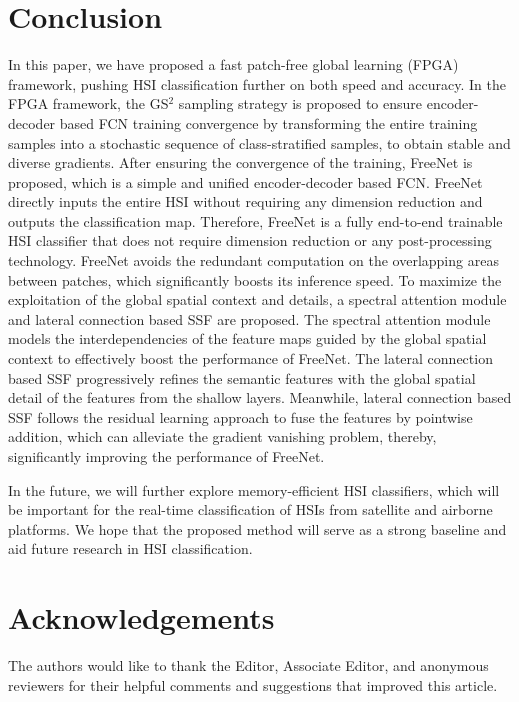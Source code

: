 \documentclass[journal]{IEEEtran}
\begin{document}
\section{Conclusion}
\label{sec:conclusion}
In this paper, we have proposed a fast patch-free global learning (FPGA) framework, pushing HSI classification further on both speed and accuracy.
In the FPGA framework, the GS$^2$ sampling strategy is proposed to ensure encoder-decoder based FCN training convergence by transforming the entire training samples into a stochastic sequence of class-stratified samples, to obtain stable and diverse gradients.
After ensuring the convergence of the training, FreeNet is proposed, which is a simple and unified encoder-decoder based FCN. 
FreeNet directly inputs the entire HSI without requiring any dimension reduction and outputs the classification map.
Therefore, FreeNet is a fully end-to-end trainable HSI classifier that does not require dimension reduction or any post-processing technology.
FreeNet avoids the redundant computation on the overlapping areas between patches, which significantly boosts its inference speed.
To maximize the exploitation of the global spatial context and details, a spectral attention module and lateral connection based SSF are proposed.
The spectral attention module models the interdependencies of the feature maps guided by the global spatial context to effectively boost the performance of FreeNet.
The lateral connection based SSF progressively refines the semantic features with the global spatial detail of the features from the shallow layers.
Meanwhile, lateral connection based SSF follows the residual learning approach to fuse the features by pointwise addition, which can alleviate the gradient vanishing problem, thereby, significantly improving the performance of FreeNet.

In the future, we will further explore memory-efficient HSI classifiers, which will be important for the real-time classification of HSIs from satellite and airborne platforms.
We hope that the proposed method will serve as a strong baseline and aid future research in HSI classification.



\section*{Acknowledgements}
The authors would like to thank the Editor, Associate Editor, and anonymous reviewers for their helpful comments and suggestions that improved this article.




\ifCLASSOPTIONcaptionsoff
  \newpage
\fi
\end{document}
